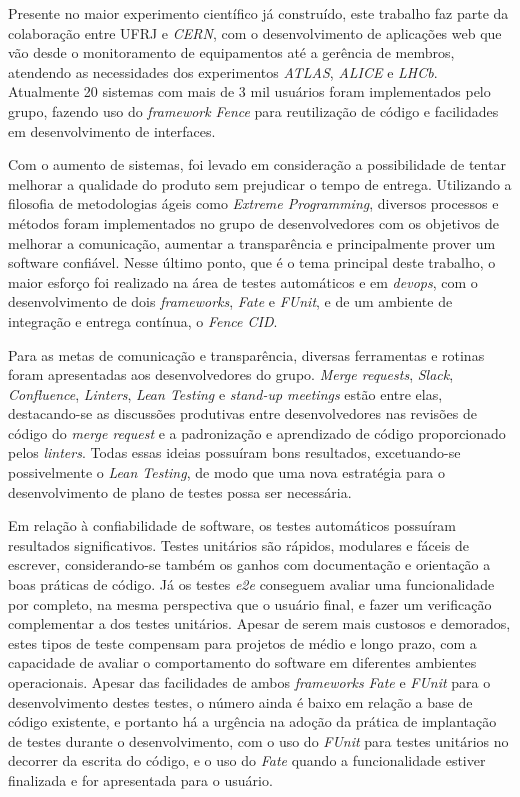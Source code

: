 Presente no maior experimento científico já construído, este trabalho faz parte da colaboração entre UFRJ e \emph{CERN}, com o desenvolvimento de aplicações web que vão desde o monitoramento de equipamentos até a gerência de membros, atendendo as necessidades dos experimentos \emph{ATLAS}, \emph{ALICE} e \emph{LHCb}. Atualmente 20 sistemas com mais de 3 mil usuários foram implementados pelo grupo, fazendo uso do \emph{framework} \emph{Fence} para reutilização de código e facilidades em desenvolvimento de interfaces.

Com o aumento de sistemas, foi levado em consideração a possibilidade de tentar melhorar a qualidade do produto sem prejudicar o tempo de entrega. Utilizando a filosofia de metodologias ágeis como \emph{Extreme Programming}, diversos processos e métodos foram implementados no grupo de desenvolvedores com os objetivos de melhorar a comunicação, aumentar a transparência e principalmente prover um software confiável. Nesse último ponto, que é o tema principal deste trabalho, o maior esforço foi realizado na área de testes automáticos e em \emph{devops}, com o desenvolvimento de dois \emph{frameworks}, \emph{Fate} e \emph{FUnit}, e de um ambiente de integração e entrega contínua, o \emph{Fence CID}.

Para as metas de comunicação e transparência, diversas ferramentas e rotinas foram apresentadas aos desenvolvedores do grupo. \emph{Merge requests}, \emph{Slack}, \emph{Confluence}, \emph{Linters}, \emph{Lean Testing} e \emph{stand-up meetings} estão entre elas, destacando-se as discussões produtivas entre desenvolvedores nas revisões de código do \emph{merge request} e a padronização e aprendizado de código proporcionado pelos \emph{linters}. Todas essas ideias possuíram bons resultados, excetuando-se possivelmente o \emph{Lean Testing}, de modo que uma nova estratégia para o desenvolvimento de plano de testes possa ser necessária.

Em relação à confiabilidade de software, os testes automáticos possuíram resultados significativos. Testes unitários são rápidos, modulares e fáceis de escrever, considerando-se também os ganhos com documentação e orientação a boas práticas de código. Já os testes \emph{e2e} conseguem avaliar uma funcionalidade por completo, na mesma perspectiva que o usuário final, e fazer um verificação complementar a dos testes unitários. Apesar de serem mais custosos e demorados, estes tipos de teste compensam para projetos de médio e longo prazo, com a capacidade de avaliar o comportamento do software em diferentes ambientes operacionais. Apesar das facilidades de ambos \emph{frameworks} \emph{Fate} e \emph{FUnit} para o desenvolvimento destes testes, o número ainda é baixo em relação a base de código existente, e portanto há a urgência na adoção da prática de implantação de testes durante o desenvolvimento, com o uso do \emph{FUnit} para testes unitários no decorrer da escrita do código, e o uso do \emph{Fate} quando a funcionalidade estiver finalizada e for apresentada para o usuário.

